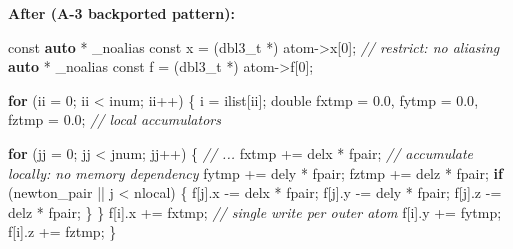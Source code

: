 \documentclass[
  11pt,
]{article}
\newenvironment{Shaded}{}{}
\newcommand{\AttributeTok}[1]{\textcolor[rgb]{0.49,0.56,0.16}{#1}}
\newcommand{\CommentTok}[1]{\textcolor[rgb]{0.38,0.63,0.69}{\textit{#1}}}
\newcommand{\ControlFlowTok}[1]{\textcolor[rgb]{0.00,0.44,0.13}{\textbf{#1}}}
\newcommand{\DataTypeTok}[1]{\textcolor[rgb]{0.56,0.13,0.00}{#1}}
\newcommand{\DecValTok}[1]{\textcolor[rgb]{0.25,0.63,0.44}{#1}}
\newcommand{\FloatTok}[1]{\textcolor[rgb]{0.25,0.63,0.44}{#1}}
\newcommand{\KeywordTok}[1]{\textcolor[rgb]{0.00,0.44,0.13}{\textbf{#1}}}
\newcommand{\NormalTok}[1]{#1}
\newcommand{\OperatorTok}[1]{\textcolor[rgb]{0.40,0.40,0.40}{#1}}
\begin{document}
\textbf{After (A-3 backported pattern):}

\begin{Shaded}
\begin{Highlighting}[]
\AttributeTok{const} \KeywordTok{auto} \OperatorTok{*}\NormalTok{ \_noalias }\AttributeTok{const}\NormalTok{ x }\OperatorTok{=} \OperatorTok{(}\DataTypeTok{dbl3\_t} \OperatorTok{*)}\NormalTok{ atom}\OperatorTok{{-}\textgreater{}}\NormalTok{x}\OperatorTok{[}\DecValTok{0}\OperatorTok{];}  \CommentTok{// restrict: no aliasing}
\KeywordTok{auto} \OperatorTok{*}\NormalTok{ \_noalias }\AttributeTok{const}\NormalTok{ f }\OperatorTok{=} \OperatorTok{(}\DataTypeTok{dbl3\_t} \OperatorTok{*)}\NormalTok{ atom}\OperatorTok{{-}\textgreater{}}\NormalTok{f}\OperatorTok{[}\DecValTok{0}\OperatorTok{];}

\ControlFlowTok{for} \OperatorTok{(}\NormalTok{ii }\OperatorTok{=} \DecValTok{0}\OperatorTok{;}\NormalTok{ ii }\OperatorTok{\textless{}}\NormalTok{ inum}\OperatorTok{;}\NormalTok{ ii}\OperatorTok{++)} \OperatorTok{\{}
\NormalTok{  i }\OperatorTok{=}\NormalTok{ ilist}\OperatorTok{[}\NormalTok{ii}\OperatorTok{];}
  \DataTypeTok{double}\NormalTok{ fxtmp }\OperatorTok{=} \FloatTok{0.0}\OperatorTok{,}\NormalTok{ fytmp }\OperatorTok{=} \FloatTok{0.0}\OperatorTok{,}\NormalTok{ fztmp }\OperatorTok{=} \FloatTok{0.0}\OperatorTok{;}         \CommentTok{// local accumulators}

  \ControlFlowTok{for} \OperatorTok{(}\NormalTok{jj }\OperatorTok{=} \DecValTok{0}\OperatorTok{;}\NormalTok{ jj }\OperatorTok{\textless{}}\NormalTok{ jnum}\OperatorTok{;}\NormalTok{ jj}\OperatorTok{++)} \OperatorTok{\{}
    \CommentTok{// ...}
\NormalTok{    fxtmp }\OperatorTok{+=}\NormalTok{ delx }\OperatorTok{*}\NormalTok{ fpair}\OperatorTok{;}   \CommentTok{// accumulate locally: no memory dependency}
\NormalTok{    fytmp }\OperatorTok{+=}\NormalTok{ dely }\OperatorTok{*}\NormalTok{ fpair}\OperatorTok{;}
\NormalTok{    fztmp }\OperatorTok{+=}\NormalTok{ delz }\OperatorTok{*}\NormalTok{ fpair}\OperatorTok{;}
    \ControlFlowTok{if} \OperatorTok{(}\NormalTok{newton\_pair }\OperatorTok{||}\NormalTok{ j }\OperatorTok{\textless{}}\NormalTok{ nlocal}\OperatorTok{)} \OperatorTok{\{}
\NormalTok{      f}\OperatorTok{[}\NormalTok{j}\OperatorTok{].}\NormalTok{x }\OperatorTok{{-}=}\NormalTok{ delx }\OperatorTok{*}\NormalTok{ fpair}\OperatorTok{;}
\NormalTok{      f}\OperatorTok{[}\NormalTok{j}\OperatorTok{].}\NormalTok{y }\OperatorTok{{-}=}\NormalTok{ dely }\OperatorTok{*}\NormalTok{ fpair}\OperatorTok{;}
\NormalTok{      f}\OperatorTok{[}\NormalTok{j}\OperatorTok{].}\NormalTok{z }\OperatorTok{{-}=}\NormalTok{ delz }\OperatorTok{*}\NormalTok{ fpair}\OperatorTok{;}
    \OperatorTok{\}}
  \OperatorTok{\}}
\NormalTok{  f}\OperatorTok{[}\NormalTok{i}\OperatorTok{].}\NormalTok{x }\OperatorTok{+=}\NormalTok{ fxtmp}\OperatorTok{;}   \CommentTok{// single write per outer atom}
\NormalTok{  f}\OperatorTok{[}\NormalTok{i}\OperatorTok{].}\NormalTok{y }\OperatorTok{+=}\NormalTok{ fytmp}\OperatorTok{;}
\NormalTok{  f}\OperatorTok{[}\NormalTok{i}\OperatorTok{].}\NormalTok{z }\OperatorTok{+=}\NormalTok{ fztmp}\OperatorTok{;}
\OperatorTok{\}}
\end{Highlighting}
\end{Shaded}
\end{document}
